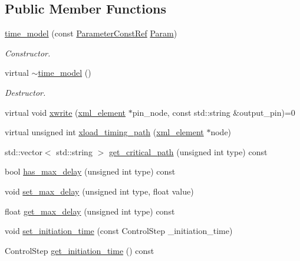 \subsection*{Public Member Functions}
\begin{DoxyCompactItemize}
\item 
\hyperlink{classtime__model_a1a53663bd0061bd8cc2cc476119f2e31}{time\+\_\+model} (const \hyperlink{Parameter_8hpp_a37841774a6fcb479b597fdf8955eb4ea}{Parameter\+Const\+Ref} \hyperlink{classtime__model_adfd18786156118b7467cef8117933674}{Param})
\begin{DoxyCompactList}\small\item\em Constructor. \end{DoxyCompactList}\item 
virtual \hyperlink{classtime__model_a4067a65b6c76225fb9c949d471532653}{$\sim$time\+\_\+model} ()
\begin{DoxyCompactList}\small\item\em Destructor. \end{DoxyCompactList}\item 
virtual void \hyperlink{classtime__model_a6f2a76cabb6407289e757cbdc155260d}{xwrite} (\hyperlink{classxml__element}{xml\+\_\+element} $\ast$pin\+\_\+node, const std\+::string \&output\+\_\+pin)=0
\item 
virtual unsigned int \hyperlink{classtime__model_aebf9b09a8d792f8628585d77c26f0f5c}{xload\+\_\+timing\+\_\+path} (\hyperlink{classxml__element}{xml\+\_\+element} $\ast$node)
\item 
std\+::vector$<$ std\+::string $>$ \hyperlink{classtime__model_af175296b2d08dfc84c7a16b61be1ebb3}{get\+\_\+critical\+\_\+path} (unsigned int type) const
\item 
bool \hyperlink{classtime__model_a952ed32fa9811586da4af0c94471f7ae}{has\+\_\+max\+\_\+delay} (unsigned int type) const
\item 
void \hyperlink{classtime__model_acd053b74c6a18db11a5de646875be6ea}{set\+\_\+max\+\_\+delay} (unsigned int type, float value)
\item 
float \hyperlink{classtime__model_ad5c3137763e7080054586c28cdfb8627}{get\+\_\+max\+\_\+delay} (unsigned int type) const
\item 
void \hyperlink{classtime__model_aae177f12db540a3e8d5b487f99ded5e8}{set\+\_\+initiation\+\_\+time} (const Control\+Step \+\_\+initiation\+\_\+time)
\item 
Control\+Step \hyperlink{classtime__model_a25614ecc690c443f3aab565a3db610f3}{get\+\_\+initiation\+\_\+time} () const

\end{DoxyCompactItemize}

